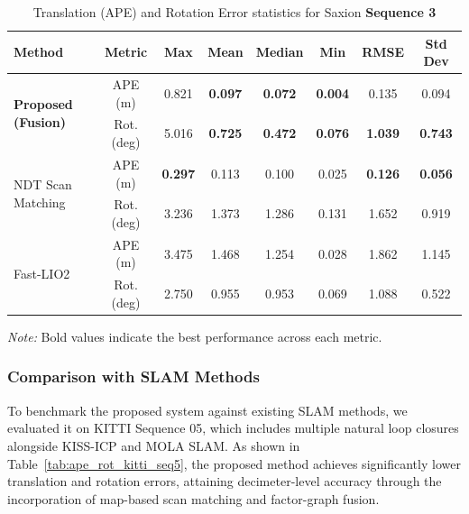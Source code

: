 \begin{table}[H]
	\centering
	\renewcommand{\arraystretch}{0.6}
	\setlength{\tabcolsep}{15pt}
	\caption{Translation (APE) and Rotation Error statistics for Saxion \textbf{Sequence 3} }
	\label{tab:ape_rot_saxion_seq3}
	
	\begin{adjustbox}{width=\textwidth}
		\begin{tabular}{@{}lccccccc@{}}
			\toprule
			\textbf{Method} & \textbf{Metric} & \textbf{Max} & \textbf{Mean} & \textbf{Median} & \textbf{Min} & \textbf{RMSE} & \textbf{Std Dev} \\
			\midrule
			
			\multirow{2}{*}{\textbf{Proposed (Fusion)}} 
			& APE (m)        & 0.821   & \textbf{0.097}   & \textbf{0.072}     & \textbf{0.004}   & 0.135   & 0.094 \\
			& Rot. (deg)     & 5.016   & \textbf{0.725}   & \textbf{0.472}     & \textbf{0.076}   & \textbf{1.039}   & \textbf{0.743} \\
			\midrule
			
			\multirow{2}{*}{NDT Scan Matching} 
			& APE (m)        & \textbf{0.297}   & 0.113   & 0.100     & 0.025    & \textbf{0.126}   & \textbf{0.056} \\
			& Rot. (deg)     & 3.236   & 1.373   & 1.286     & 0.131    & 1.652   & 0.919 \\
			\midrule
			
			\multirow{2}{*}{Fast-LIO2} 
			& APE (m)        & 3.475   & 1.468   & 1.254     & 0.028    & 1.862   & 1.145 \\
			& Rot. (deg)     & 2.750   & 0.955   & 0.953     & 0.069    & 1.088   & 0.522 \\
			\bottomrule
		\end{tabular}
	\end{adjustbox}
{\footnotesize \textit{Note:} Bold values indicate the best performance across each metric.}
\end{table}



\subsubsection{Comparison with SLAM Methods }

To benchmark the proposed system against existing SLAM methods, we evaluated it on KITTI Sequence 05, which includes multiple natural loop closures alongside KISS-ICP  and MOLA SLAM. As shown in Table~\ref{tab:ape_rot_kitti_seq5}, the proposed method achieves significantly lower translation and rotation errors, attaining decimeter-level accuracy through the incorporation of map-based scan matching and factor-graph fusion.

